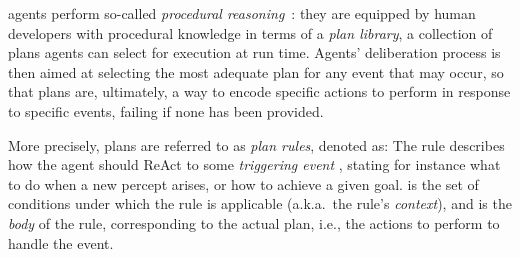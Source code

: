 \documentclass[12pt,a4paper,openright,twoside]{book}
\begin{document}
\agentspeak{} agents perform so-called \emph{procedural reasoning}~\cite{IngrandGR1992}: they are equipped by human developers with procedural knowledge in terms of a \emph{plan library}, a collection of plans agents can select for execution at run time.
%
Agents' deliberation process is then aimed at selecting the most adequate plan for any event that may occur, so that plans are, ultimately, a way to encode specific actions to perform in response to specific events, failing if none has been provided.

More precisely, \agentspeak{} plans are referred to as \emph{plan rules}, denoted as:
%
%
The rule describes how the agent should \ac{ReAct} to some \emph{triggering event} , stating for instance what to do when a new percept arises, or how to achieve a given goal.
%
 is the set of conditions under which the rule is applicable (a.k.a.\ the rule's \emph{context}), and  is the \emph{body} of the rule, corresponding to the actual plan, i.e., the actions to perform to handle the event.
\end{document}
